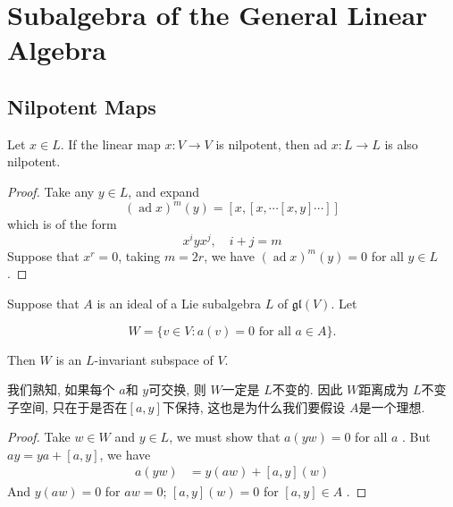 \documentclass[../main.tex]{subfiles}
\begin{document}
\ifSubfilesClassLoaded{

    
}{}

\chapter{ Subalgebra of the General Linear Algebra }

\section{Nilpotent Maps}

\begin{lemma}{}{}
Let $x \in L$. If the linear map $x : V \to V$ is nilpotent, then ad $x : L \to L$ is also nilpotent.
\end{lemma}

\begin{proof}
    Take any \(  y\in L  \), and expand \[
    \left( \operatorname{ad}x \right) ^{m}\left( y \right)= \left[ x,\left[ x,\cdots \left[ x,y \right]  \cdots \right]  \right]  
    \] which is of the form \[
    x^{i}yx^{j},\quad i+ j= m
    \] Suppose that \(  x^{r}= 0  \), taking \(  m= 2r  \), we have \(  \left( \operatorname{ad}x \right)^{m}\left( y \right)= 0    \) for all \(  y \in L  \).    
\end{proof}

\begin{lemma}{}{}
   Suppose that $A$ is an ideal of a Lie subalgebra $L$ of $\mathfrak{gl}(V)$. Let

\[
W = \{v \in V : a(v) = 0 \text{ for all } a \in A\}.
\]

Then $W$ is an $L$-invariant subspace of $V$.
\end{lemma}
\begin{remark}
   我们熟知, 如果每个 \(  a  \)和 \(  y  \)可交换, 则  \(  W  \)一定是 \(  L  \)不变的. 因此 \(  W  \)距离成为 \(  L  \)不变子空间, 只在于是否在\(  \left[ a,y \right]   \)下保持, 这也是为什么我们要假设 \(  A  \)是一个理想.     
\end{remark}
\begin{proof}
   Take \(  w\in W  \) and \(  y \in L  \), we must show that \(  a\left( yw \right)= 0   \) for all \(  a  \) . But \(  ay= ya+ \left[ a,y \right]   \), we have \[
   \begin{aligned}
   a\left( yw \right)&= y\left( aw \right)+ \left[ a,y \right]\left( w \right)   
   \end{aligned}
   \]    And \(  y\left( aw \right)= 0   \) for \(  aw= 0  \); \(  \left[ a,y \right]\left( w \right)= 0     \) for \(  \left[ a,y \right]\in A   \)   . 
\end{proof}
\end{document}
